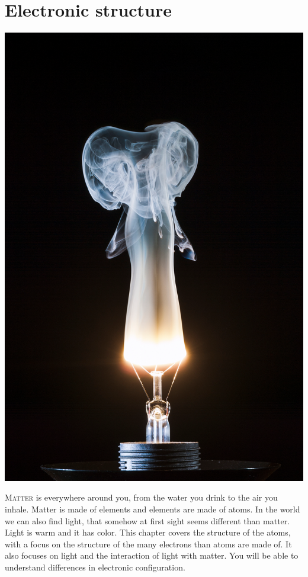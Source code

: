 \documentclass[main.tex]{subfiles}
\begin{document}
\linenumbers

  

\chapter[Electronic structure]{Electronic structure}

\begin{marginfigure}
      \includegraphics{chapter3/figure1}

   \end{marginfigure}
\lettrine[lines=4]{\color{black!45}M}{atter} is everywhere around you, from the water you drink to the air you inhale. Matter is made of elements and elements are made of atoms. In the world we can also find light, that somehow at first sight seems different than matter. Light is warm and it has color. This chapter covers the structure of the atoms, with a focus on the structure of the many electrons than atoms are made of. It also focuses on light and the interaction of light with matter. You will be able to understand differences in electronic configuration.
 
\end{document}
